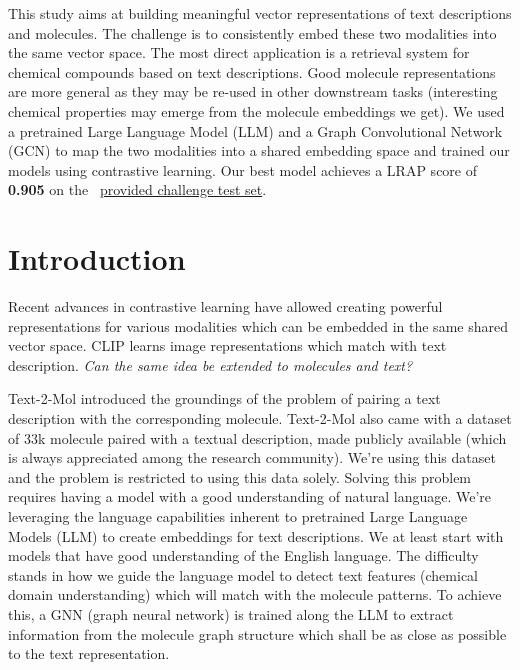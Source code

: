 This study aims at building meaningful vector representations of text descriptions and molecules. The challenge is to consistently embed these two modalities into the same vector space. The most direct application is a retrieval system for chemical compounds based on text descriptions. Good molecule representations are more general as they may be re-used in other downstream tasks (interesting chemical properties may emerge from the molecule embeddings we get). We used a pretrained Large Language Model (LLM) and a Graph Convolutional Network (GCN) to map the two modalities into a shared embedding space and trained our models using contrastive learning. Our best model achieves a LRAP score of \textbf{0.905} on the  ~\href{https://www.kaggle.com/competitions/altegrad-2023-data-challenge/leaderboard}{provided challenge test set}.

\section{Introduction}
\label{sec:intro}
Recent advances in contrastive learning have allowed creating powerful representations for various modalities which can be embedded in the same shared vector space. CLIP \cite{CLIP} learns image representations which match with text description. \textit{Can the same idea be extended to molecules and text?}

Text-2-Mol \cite{text2mol} introduced the groundings of the problem of pairing a text description with the corresponding molecule.
Text-2-Mol also came with a dataset of 33k molecule paired with a textual description, made publicly available (which is always appreciated among the research community).
We're using this dataset and the problem is restricted to using this data solely. Solving this problem requires having a model with a good understanding of natural language. We're leveraging the language capabilities inherent to pretrained Large Language Models (LLM) to create embeddings for text descriptions. We at least start with models that have good understanding of the English language. The difficulty stands in how we guide the language model to detect text features (chemical domain understanding) which will match with the molecule patterns. To achieve this, a GNN (graph neural network) is trained along the LLM to extract information from the molecule graph structure which shall be as close as possible to the text representation.